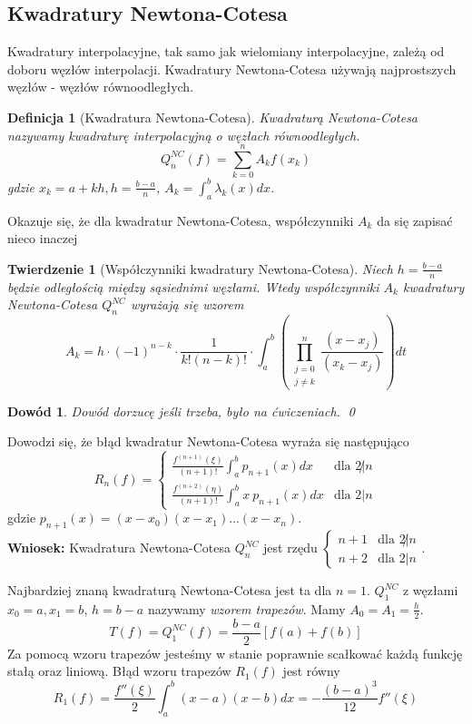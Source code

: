 \documentclass{article}
\newtheorem{defi}{Definicja}
\newtheorem{twr}{Twierdzenie}
\newtheorem*{dd}{Dowód}
\newcommand{\twopartdef}[4]
{
	\left\{
		\begin{array}{ll}
			#1 & \mbox{dla } #2 \\
			#3 & \mbox{dla } #4
		\end{array}
	\right.
}
\begin{document}
\subsection{Kwadratury Newtona-Cotesa}
Kwadratury interpolacyjne, tak samo jak wielomiany interpolacyjne, zależą od doboru węzłów interpolacji.
Kwadratury Newtona-Cotesa używają najprostszych węzłów - węzłów równoodległych.
\begin{defi}[Kwadratura Newtona-Cotesa]
	Kwadraturą Newtona-Cotesa nazywamy kwadraturę interpolacyjną o węzłach równoodległych.
	\begin{equation*}
		Q_n^{NC}(f) = \sum_{k = 0}^n A_k f(x_k)
	\end{equation*}
	gdzie $x_k = a + k h, h = \frac{b - a}{n}$, $A_k = \int_a^b \lambda_k(x) dx$.
\end{defi}
Okazuje się, że dla kwadratur Newtona-Cotesa, współczynniki $A_k$ da się zapisać nieco inaczej
\begin{twr}[Współczynniki kwadratury Newtona-Cotesa]
	Niech $h = \frac{b - a}{n}$ będzie odległością między sąsiednimi węzłami.
	Wtedy współczynniki $A_k$ kwadratury Newtona-Cotesa $Q_n^{NC}$ wyrażają się wzorem
	\begin{equation*}
		A_k = h \cdot (-1)^{n - k} \cdot \frac{1}{k! (n-k)!} \cdot \int_a^b \left ( \prod_{\substack{j = 0 \\ j \neq k}}^n \frac{(x - x_j)}{(x_k - x_j)}\right ) dt
	\end{equation*}
\end{twr}
\begin{dd}
	\normalfont
	Dowód dorzucę jeśli trzeba, było na ćwiczeniach.
	\qed
\end{dd}

Dowodzi się, że błąd kwadratur Newtona-Cotesa wyraża się następująco
\begin{equation*}
	R_n(f) = \twopartdef {\frac{f^{(n + 1)}(\xi)}{(n+1)!} \int_a^b p_{n + 1}(x) dx} {2\not| n} {\frac{f^{(n + 2)}(\eta)}{(n+1)!} \int_a^b x \ p_{n + 1}(x) dx} {2 | n}
\end{equation*}
gdzie $p_{n+1}(x) = (x - x_0) (x - x_1) ... (x - x_n)$. \\
\textbf{Wniosek: }Kwadratura Newtona-Cotesa $Q_n^{NC}$ jest rzędu $\twopartdef {n + 1} {2\not| n} {n + 2} {2 | n}$.

Najbardziej znaną kwadraturą Newtona-Cotesa jest ta dla $n = 1$. $Q_1^{NC}$ z węzłami $x_0 = a, x_1 = b$, $h = b - a$ nazywamy \emph{wzorem trapezów}.
Mamy $A_0 = A_1 = \frac{h}{2}$.
\begin{equation}
	T(f) = Q_1^{NC}(f) = \frac{b - a}{2} [f(a) + f(b)]
\end{equation}
Za pomocą wzoru trapezów jesteśmy w stanie poprawnie scałkować każdą funkcję stałą oraz liniową.
Błąd wzoru trapezów $R_1(f)$ jest równy
\begin{equation*}
	R_1(f) = \frac{f''(\xi)}{2} \int_a^b (x - a)(x - b) dx = - \frac{(b - a)^3}{12} f''(\xi)
\end{equation*}
\end{document}
